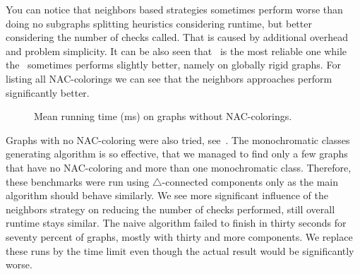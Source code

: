 You can notice that neighbors based strategies sometimes perform worse
than doing no subgraphs splitting heuristics considering runtime,
but better considering the number of checks called.
That is caused by additional overhead and problem simplicity.
It can be also seen that \MergeLinear\ is the most reliable one
while the \SharedVertices\ sometimes performs slightly better,
namely on globally rigid graphs.
For listing all NAC-colorings we can see that the neighbors approaches perform
significantly better.

\begin{figure}[h]
	\centering
	\scalebox{0.5}{}
	\caption{Mean running time (ms) on graphs without NAC-colorings.}%
	\label{fig:graph_time_no_nac_coloring}
\end{figure}

Graphs with no NAC-coloring were also tried, see~.
The monochromatic classes generating algorithm is so effective,
that we managed to find only a few graphs that have no NAC-coloring
and more than one monochromatic class. Therefore, these benchmarks were run
using $\triangle$-connected components only as the main algorithm should behave similarly.
We see more significant influence of the neighbors strategy
on reducing the number of checks performed,
still overall runtime stays similar.
The naive algorithm failed to finish in thirty seconds
for seventy percent of graphs, mostly with thirty and more components.
We replace these runs by the time limit even though the actual result would
be significantly worse.
